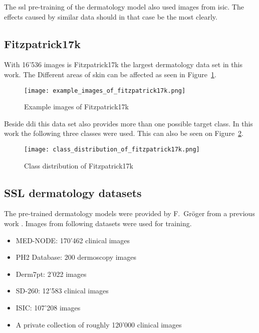 The \gls{ssl} pre-training of the dermatology model also used images from \gls{isic}. 
The effects caused by similar data should in that case be the most clearly.

\subsection{Fitzpatrick17k}
With 16'536 images is Fitzpatrick17k the largest dermatology data set in this work. 
The Different areas of skin can be affected as seen in Figure~\ref{fig:example_images_of_fitzpatrick17k}.

\begin{figure}[H]
    \begin{center}
    \texttt{[image: example\_images\_of\_fitzpatrick17k.png]}
    \caption{Example images of Fitzpatrick17k}\label{fig:example_images_of_fitzpatrick17k}
    \end{center}
\end{figure}

Beside \gls{ddi} this data set also provides more than one possible target class. 
In this work the following three classes were used. This can also be seen on Figure~\ref{fig:class_distribution_of_fitzpatrick17k}.

\begin{figure}[H]
    \begin{center}
    \texttt{[image: class\_distribution\_of\_fitzpatrick17k.png]}
    \caption{Class distribution of Fitzpatrick17k}\label{fig:class_distribution_of_fitzpatrick17k}
    \end{center}
\end{figure}

\subsection{SSL dermatology datasets}
The pre-trained dermatology models were provided by F.~Gröger from a previous work \autocite{groeger2023}. 
Images from following datasets were used for training.

\begin{itemize}
    \item MED-NODE: 170'462 clinical images \autocite{giotis2015}
    \item PH2 Database: 200 dermoscopy images \autocite{mendonca2013}
    \item Derm7pt: 2'022 images \autocite{kawahara2019}
    \item SD-260: 12'583 clinical images \autocite{sun2016}
    \item ISIC: 107'208 images \autocite{giotis2015}
    \item A private collection of roughly 120'000 clinical images 
\end{itemize}


